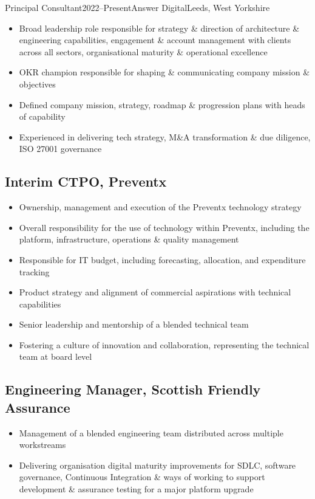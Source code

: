 \documentclass{cv}
\begin{document}
\begin{experienceplain}{Principal Consultant}{2022--Present}{Answer Digital}{Leeds, West Yorkshire}
\begin{itemize}
\item Broad leadership role responsible for strategy \& direction of architecture \& engineering
      capabilities, engagement \& account management with clients across all sectors, organisational
      maturity \& operational excellence
\item OKR champion responsible for shaping \& communicating company mission \& objectives
\item Defined company mission, strategy, roadmap \& progression plans with heads of capability
\item Experienced in delivering tech strategy, M\&A transformation \& due diligence, ISO 27001 governance
\end{itemize}

\subsection{Interim CTPO, Preventx}
\begin{itemize}
\item Ownership, management and execution of the Preventx technology strategy
\item Overall responsibility for the use of technology within Preventx, including the platform,
      infrastructure, operations \& quality management
\item Responsible for IT budget, including forecasting, allocation, and expenditure tracking
\item Product strategy and alignment of commercial aspirations with technical capabilities
\item Senior leadership and mentorship of a blended technical team
\item Fostering a culture of innovation and collaboration, representing the technical team at board level
\end{itemize}

\subsection{Engineering Manager, Scottish Friendly Assurance}
\begin{itemize}
\item Management of a blended engineering team distributed across multiple workstreams
\item Delivering organisation digital maturity improvements for SDLC, software governance,
      Continuous Integration \& ways of working to support development \& assurance testing for a
      major platform upgrade
\end{itemize}


\end{experienceplain}
\end{document}
